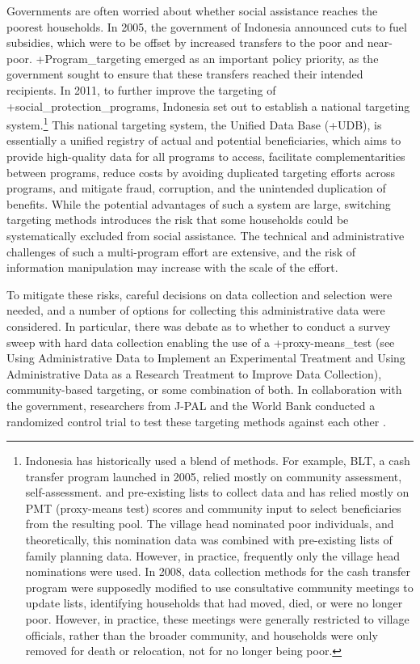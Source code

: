 \documentclass[
]{WileySix}
\begin{document}
Governments are often worried about whether social assistance reaches the poorest households. In 2005, the government of Indonesia announced cuts to fuel subsidies, which were to be offset by increased transfers to the poor and near-poor. +Program\_targeting\textbar{} emerged as an important policy priority, as the government sought to ensure that these transfers reached their intended recipients. In 2011, to further improve the targeting of +social\_protection\_programs\textbar, Indonesia set out to establish a national targeting system.\footnote{Indonesia has historically used a blend of methods. For example, BLT, a cash transfer program launched in 2005, relied mostly on community assessment, self-assessment. and pre-existing lists to collect data and has relied mostly on PMT (proxy-means test) scores and community input to select beneficiaries from the resulting pool. The village head nominated poor individuals, and theoretically, this nomination data was combined with pre-existing lists of family planning data. However, in practice, frequently only the village head nominations were used. In 2008, data collection methods for the cash transfer program were supposedly modified to use consultative community meetings to update lists, identifying households that had moved, died, or were no longer poor. However, in practice, these meetings were generally restricted to village officials, rather than the broader community, and households were only removed for death or relocation, not for no longer being poor.} This national targeting system, the Unified Data Base (+UDB\textbar), is essentially a unified registry of actual and potential beneficiaries, which aims to provide high-quality data for all programs to access, facilitate complementarities between programs, reduce costs by avoiding duplicated targeting efforts across programs, and mitigate fraud, corruption, and the unintended duplication of benefits. While the potential advantages of such a system are large, switching targeting methods introduces the risk that some households could be systematically excluded from social assistance. The technical and administrative challenges of such a multi-program effort are extensive, and the risk of information manipulation may increase with the scale of the effort.

To mitigate these risks, careful decisions on data collection and selection were needed, and a number of options for collecting this administrative data were considered. In particular, there was debate as to whether to conduct a survey sweep with hard data collection enabling the use of a +proxy-means\_test\textbar{} (see Using Administrative Data to Implement an Experimental Treatment and Using Administrative Data as a Research Treatment to Improve Data Collection), community-based targeting, or some combination of both. In collaboration with the government, researchers from J-PAL and the World Bank conducted a randomized control trial to test these targeting methods against each other \citep{alatas2012}.
\end{document}
